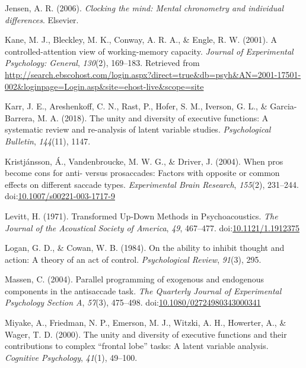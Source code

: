 \documentclass[
  ,man,floatsintext]{apa6}
\newlength{\cslhangindent}
\newlength{\cslentryspacingunit} %
\newenvironment{CSLReferences}[2] %
 {%
  \setlength{\parindent}{0pt}
  \ifodd #1
  \let\oldpar\par
  \def\par{\hangindent=\cslhangindent\oldpar}
  \fi
  \setlength{\parskip}{#2\cslentryspacingunit}
 }%
 {}
\begin{document}
\begin{CSLReferences}{1}{0}
\leavevmode{}%
Jensen, A. R. (2006). \emph{Clocking the mind: {Mental} chronometry and individual differences}. {Elsevier}.

\leavevmode{}%
Kane, M. J., Bleckley, M. K., Conway, A. R. A., \& Engle, R. W. (2001). A controlled-attention view of working-memory capacity. \emph{Journal of Experimental Psychology: General}, \emph{130}(2), 169--183. Retrieved from \url{http://search.ebscohost.com/login.aspx?direct=true\&db=psyh\&AN=2001-17501-002\&loginpage=Login.asp\&site=ehost-live\&scope=site}

\leavevmode{}%
Karr, J. E., Areshenkoff, C. N., Rast, P., Hofer, S. M., Iverson, G. L., \& Garcia-Barrera, M. A. (2018). The unity and diversity of executive functions: {A} systematic review and re-analysis of latent variable studies. \emph{Psychological Bulletin}, \emph{144}(11), 1147.

\leavevmode{}%
Kristjánsson, Á., Vandenbroucke, M. W. G., \& Driver, J. (2004). When pros become cons for anti- versus prosaccades: Factors with opposite or common effects on different saccade types. \emph{Experimental Brain Research}, \emph{155}(2), 231--244. doi:\href{https://doi.org/10.1007/s00221-003-1717-9}{10.1007/s00221-003-1717-9}

\leavevmode{}%
Levitt, H. (1971). Transformed {Up}‐{Down Methods} in {Psychoacoustics}. \emph{The Journal of the Acoustical Society of America}, \emph{49}, 467--477. doi:\href{https://doi.org/10.1121/1.1912375}{10.1121/1.1912375}

\leavevmode{}%
Logan, G. D., \& Cowan, W. B. (1984). On the ability to inhibit thought and action: {A} theory of an act of control. \emph{Psychological Review}, \emph{91}(3), 295.

\leavevmode{}%
Massen, C. (2004). Parallel programming of exogenous and endogenous components in the antisaccade task. \emph{The Quarterly Journal of Experimental Psychology Section A}, \emph{57}(3), 475--498. doi:\href{https://doi.org/10.1080/02724980343000341}{10.1080/02724980343000341}

\leavevmode{}%
Miyake, A., Friedman, N. P., Emerson, M. J., Witzki, A. H., Howerter, A., \& Wager, T. D. (2000). The unity and diversity of executive functions and their contributions to complex {``frontal lobe''} tasks: {A} latent variable analysis. \emph{Cognitive Psychology}, \emph{41}(1), 49--100.


\end{CSLReferences}
\end{document}
